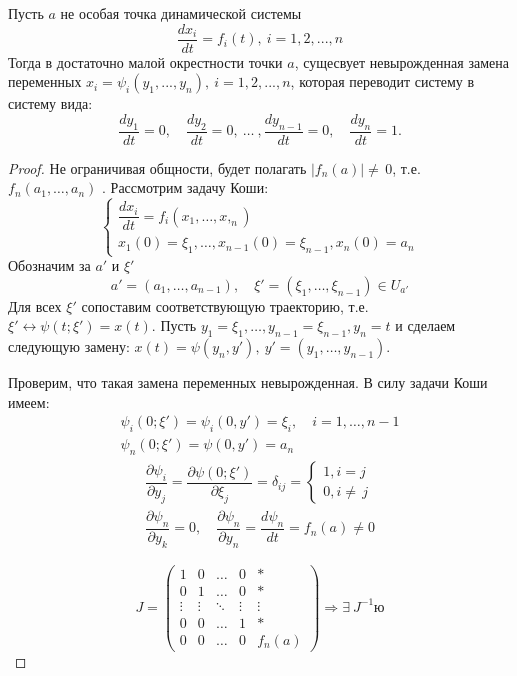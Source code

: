 \begin{theorem}
Пусть $a$ не особая точка динамической системы
$$
\dfrac{dx_i}{dt}=f_i(t),\ i=1,2,...,n
$$
Тогда в достаточно малой окрестности точки $a$, сущесвует невырожденная замена переменных $x_i=\psi_i(y_1,...,y_n),\ i=1,2,...,n$, которая переводит систему в систему вида:
$$
\dfrac{dy_1}{dt}=0,\quad \dfrac{dy_2}{dt}=0,\ \ldots\ ,\dfrac{dy_{n-1}}{dt}=0,\quad \dfrac{dy_n}{dt}=1.
$$
\end{theorem} 
\begin{proof}
Не ограничивая общности, будет полагать $|f_n(a)|\neq\,0$, т.е. $f_n(a_1,\ldots,a_n)$ . Рассмотрим задачу Коши:
$$
\begin{cases}
\dfrac{dx_i}{dt}=f_i(x_1,\ldots,x,_n)\\
x_1(0)=\xi_1,\ldots,x_{n-1}(0)=\xi_{n-1}, x_n(0)=a_n
\end{cases}
$$
Обозначим за $a'$ и $\xi'$
$$
a'=(a_1,\ldots,a_{n-1}),\quad \xi'=(\xi_1,\ldots,\xi_{n-1})\in U_{a'}
$$
Для всех $\xi'$ сопоставим соответствующую траекторию, т.е. $\xi'\longleftrightarrow \psi(t;\xi')=x(t)$. Пусть $y_1=\xi_1,\ldots,y_{n-1}=\xi_{n-1},y_n=t$ и сделаем следующую замену: $x(t)=\psi(y_n,y'),\ y'=(y_1,\dots,y_{n-1})$. 

Проверим, что такая замена переменных невырожденная. В силу задачи Коши имеем:
$$
\begin{array}{ll}
\psi_i(0;\xi')=\psi_i(0,y')=\xi_i,\quad i=1,\dots,n-1\\
\psi_n(0;\xi')=\psi(0,y')=a_n
\end{array}
$$
$$
\begin{array}{ll}
\dfrac{\partial\psi_i}{\partial y_j}=\dfrac{\partial\psi(0;\xi')}{\partial\xi_j}=\delta_{ij}=\begin{cases} 1,i=j\\0,i\neq\,j\end{cases}\\
\dfrac{\partial\psi_n}{\partial y_k}=0,\quad \dfrac{\partial \psi_n}{\partial y_n}=\dfrac{d\psi_n}{dt}=f_n(a)\neq 0
\end{array}
$$

$$
J=
\begin{pmatrix}
1 & 0 & \dots & 0 & * \\
0 & 1 &  \dots &  0 & * \\
\vdots &\vdots & \ddots & \vdots& \vdots\\
0  & 0 &\dots  & 1 & *\\
0 & 0 & \dots & 0 & f_n(a)
\end{pmatrix}\Rightarrow \exists\ J^{-1}ю
$$
\end{proof}

